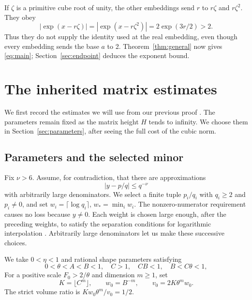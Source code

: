 \documentclass[11pt]{article}
\theoremstyle{remark}
\begin{document}
If $\zeta$ is a primitive cube root of unity, the other
embeddings send $r$ to $r\zeta$ and $r\zeta^2$. They obey
\[
 |\exp(x-r\zeta)|=|\exp(x-r\zeta^2)|
 =2\exp(3r/2)>2.
\]
Thus they do not supply the identity used at the real embedding,
even though every embedding sends the base $a$ to 2.
Theorem~\ref{thm:general} now gives \eqref{eq:main};
Section~\ref{sec:endpoint} deduces the exponent bound.

\section{The inherited matrix estimates}\label{sec:estimates}
We first record the estimates we will use from our previous proof
\cite[Sections 4--8]{affine}. The parameters remain fixed as the matrix
height $H$ tends to infinity. We choose them in
Section~\ref{sec:parameters}, after seeing the full cost of the cubic
norm.

\subsection{Parameters and the selected minor}
Fix $\nu>6$. Assume, for contradiction, that there are approximations
\begin{equation}\label{eq:bad}
 |y-p/q|\le q^{-\nu}
\end{equation}
with arbitrarily large denominators. We select
a finite tuple $p_i/q_i$ with $q_i\ge2$ and $p_i\ne0$, and set
$w_i=\lceil\log q_i\rceil$, $w_* =\min_i w_i$.
The nonzero-numerator requirement causes no loss because $y\ne0$.
Each weight is chosen large enough, after the preceding weights, to
satisfy the separation conditions for logarithmic interpolation
\cite[Sections 4--5]{affine}. Arbitrarily large denominators let us
make these successive choices.

We take $0<\eta<1$ and rational shape parameters satisfying
\begin{equation}\label{eq:shape}
 0<\theta<A<B<1,\quad C>1,\quad CB<1,
 \quad B<C\theta<1,
\end{equation}
For a positive scale $F_0>2/\theta$ and dimension
$m\ge1$, set
\begin{equation}\label{eq:dimension}
 K=\lfloor C^m\rfloor,\qquad w_0=B^{-m},\qquad
 v_0=2K\theta^m w_0.
\end{equation}
The strict volume ratio is $Kw_0\theta^m/v_0=1/2$.
\end{document}

